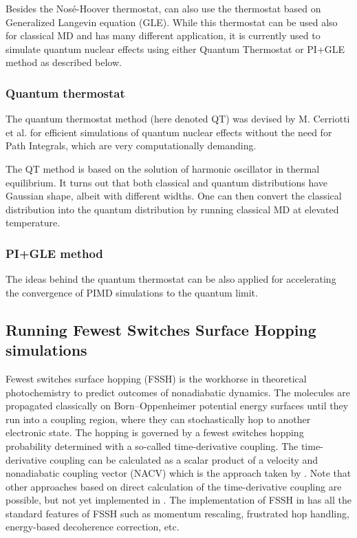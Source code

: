 Besides the Nosé-Hoover thermostat, \abin can also use the thermostat based on Generalized Langevin equation (GLE). While this thermostat can be used also for classical MD and has many different application, it is currently used to simulate quantum nuclear effects using either Quantum Thermostat or PI+GLE method as described below.

\subsubsection{Quantum thermostat}

The quantum thermostat method (here denoted QT) was devised by M. Cerriotti et al. %
for efficient simulations of quantum nuclear effects without the need for Path Integrals, which are very computationally demanding. 

The QT method is based on the solution of harmonic oscillator in thermal equilibrium. 
It turns out that both classical and quantum distributions have Gaussian shape, albeit with different widths. One can then convert the classical distribution into the quantum distribution
by running classical MD at elevated temperature.



\subsubsection{PI+GLE method}
The ideas behind the quantum thermostat can be also applied for accelerating the convergence of PIMD simulations to the quantum limit.  


\subsection{Running Fewest Switches Surface Hopping simulations}
Fewest switches surface hopping (FSSH) is the workhorse in theoretical photochemistry to predict outcomes of nonadiabatic dynamics. The molecules are propagated classically on Born--Oppenheimer potential energy surfaces until they run into a coupling region, where they can stochastically hop to another electronic state. The hopping is governed by a fewest switches hopping probability determined with a so-called time-derivative coupling. The time-derivative coupling can be calculated as a scalar product of a velocity and nonadiabatic coupling vector (NACV) which is the approach taken by \abin. Note that other approaches based on direct calculation of the time-derivative coupling are possible, but not yet implemented in \abin.
The implementation of FSSH in \abin has all the standard features of FSSH such as momentum rescaling, frustrated hop handling, energy-based decoherence correction\cite{Granucci2007}, etc.  

